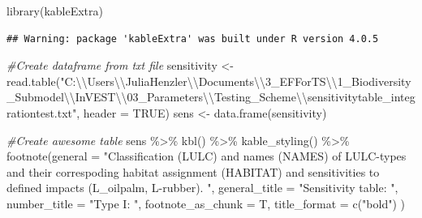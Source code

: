 \documentclass[
]{article}
\newenvironment{Shaded}{\begin{snugshade}}{\end{snugshade}}
\newcommand{\AttributeTok}[1]{\textcolor[rgb]{0.77,0.63,0.00}{#1}}
\newcommand{\CommentTok}[1]{\textcolor[rgb]{0.56,0.35,0.01}{\textit{#1}}}
\newcommand{\ConstantTok}[1]{\textcolor[rgb]{0.00,0.00,0.00}{#1}}
\newcommand{\FunctionTok}[1]{\textcolor[rgb]{0.00,0.00,0.00}{#1}}
\newcommand{\NormalTok}[1]{#1}
\newcommand{\OtherTok}[1]{\textcolor[rgb]{0.56,0.35,0.01}{#1}}
\newcommand{\SpecialCharTok}[1]{\textcolor[rgb]{0.00,0.00,0.00}{#1}}
\newcommand{\StringTok}[1]{\textcolor[rgb]{0.31,0.60,0.02}{#1}}
\begin{document}
\begin{Shaded}
\begin{Highlighting}[]
\FunctionTok{library}\NormalTok{(kableExtra)}
\end{Highlighting}
\end{Shaded}

\begin{verbatim}
## Warning: package 'kableExtra' was built under R version 4.0.5
\end{verbatim}

\begin{Shaded}
\begin{Highlighting}[]
\CommentTok{\#Create dataframe from txt file}
\NormalTok{sensitivity }\OtherTok{\textless{}{-}} \FunctionTok{read.table}\NormalTok{(}\StringTok{"C:}\SpecialCharTok{\textbackslash{}\textbackslash{}}\StringTok{Users}\SpecialCharTok{\textbackslash{}\textbackslash{}}\StringTok{JuliaHenzler}\SpecialCharTok{\textbackslash{}\textbackslash{}}\StringTok{Documents}\SpecialCharTok{\textbackslash{}\textbackslash{}}\StringTok{3\_EFForTS}\SpecialCharTok{\textbackslash{}\textbackslash{}}\StringTok{1\_Biodiversity\_Submodel}\SpecialCharTok{\textbackslash{}\textbackslash{}}\StringTok{InVEST}\SpecialCharTok{\textbackslash{}\textbackslash{}}\StringTok{03\_Parameters}\SpecialCharTok{\textbackslash{}\textbackslash{}}\StringTok{Testing\_Scheme}\SpecialCharTok{\textbackslash{}\textbackslash{}}\StringTok{sensitivitytable\_integrationtest.txt"}\NormalTok{, }\AttributeTok{header =} \ConstantTok{TRUE}\NormalTok{)}
\NormalTok{sens }\OtherTok{\textless{}{-}} \FunctionTok{data.frame}\NormalTok{(sensitivity)}

\CommentTok{\#Create awesome table}
\NormalTok{sens }\SpecialCharTok{\%\textgreater{}\%}
  \FunctionTok{kbl}\NormalTok{() }\SpecialCharTok{\%\textgreater{}\%}
  \FunctionTok{kable\_styling}\NormalTok{() }\SpecialCharTok{\%\textgreater{}\%}
  \FunctionTok{footnote}\NormalTok{(}\AttributeTok{general =} \StringTok{"Classification (LULC) and names (NAMES) of LULC{-}types and their correspoding habitat assignment (HABITAT) and sensitivities to defined impacts (L\_oilpalm, L{-}rubber). "}\NormalTok{,}
           \AttributeTok{general\_title =} \StringTok{"Sensitivity table: "}\NormalTok{, }\AttributeTok{number\_title =} \StringTok{"Type I: "}\NormalTok{,}
           \AttributeTok{footnote\_as\_chunk =}\NormalTok{ T, }\AttributeTok{title\_format =} \FunctionTok{c}\NormalTok{(}\StringTok{"bold"}\NormalTok{)}
\NormalTok{  )}
\end{Highlighting}
\end{Shaded}
\end{document}
